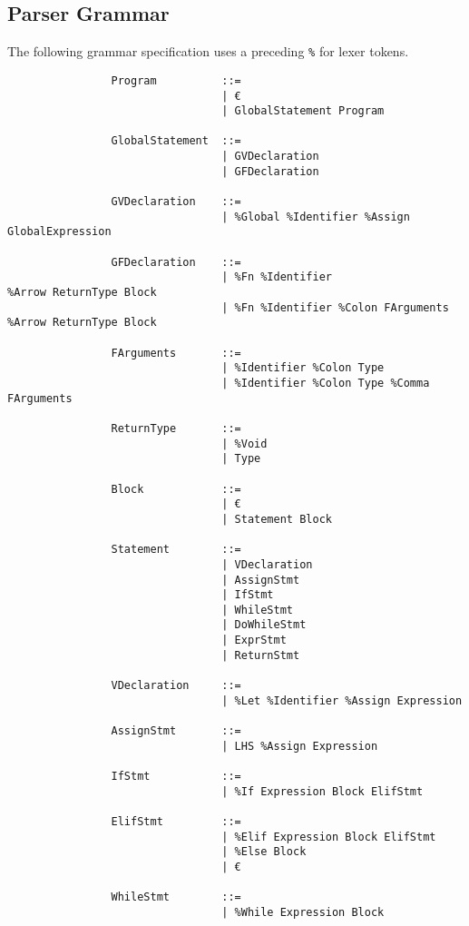 \documentclass{article}
\begin{document}
		\subsection{Parser Grammar}
		
			The following grammar specification uses a preceding \texttt{\%} for lexer tokens.
		
			\begin{verbatim}
				Program          ::=
				                 | €
				                 | GlobalStatement Program
				                 
				GlobalStatement  ::=
				                 | GVDeclaration
				                 | GFDeclaration
				                 
				GVDeclaration    ::=
				                 | %Global %Identifier %Assign GlobalExpression
				                 
				GFDeclaration    ::=
				                 | %Fn %Identifier                   %Arrow ReturnType Block
				                 | %Fn %Identifier %Colon FArguments %Arrow ReturnType Block
				                 
				FArguments       ::=
				                 | %Identifier %Colon Type
				                 | %Identifier %Colon Type %Comma FArguments
				
				ReturnType       ::=
				                 | %Void
				                 | Type
				                 
				Block            ::=
				                 | €
				                 | Statement Block
				
				Statement        ::=
				                 | VDeclaration
				                 | AssignStmt
				                 | IfStmt
				                 | WhileStmt
				                 | DoWhileStmt
				                 | ExprStmt
				                 | ReturnStmt
				                 
				VDeclaration     ::=
				                 | %Let %Identifier %Assign Expression
				                 
				AssignStmt       ::=
				                 | LHS %Assign Expression
				                 
				IfStmt           ::=
				                 | %If Expression Block ElifStmt
				                 
				ElifStmt         ::=
				                 | %Elif Expression Block ElifStmt
				                 | %Else Block
				                 | €
				                 
				WhileStmt        ::=
				                 | %While Expression Block
				

\end{verbatim}
\end{document}
